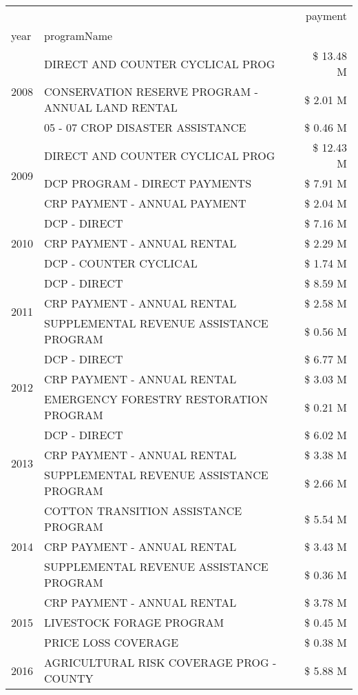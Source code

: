 \begin{tabular}{llr}
\toprule
 &  & payment \\
year & programName &  \\
\midrule
\multirow[t]{3}{*}{2008} & DIRECT AND COUNTER CYCLICAL PROG & \$ 13.48 M \\
 & CONSERVATION RESERVE PROGRAM - ANNUAL LAND RENTAL & \$ 2.01 M \\
 & 05 - 07 CROP DISASTER ASSISTANCE & \$ 0.46 M \\
\cline{1-3}
\multirow[t]{3}{*}{2009} & DIRECT AND COUNTER CYCLICAL PROG & \$ 12.43 M \\
 & DCP PROGRAM - DIRECT PAYMENTS & \$ 7.91 M \\
 & CRP PAYMENT - ANNUAL PAYMENT & \$ 2.04 M \\
\cline{1-3}
\multirow[t]{3}{*}{2010} & DCP - DIRECT & \$ 7.16 M \\
 & CRP PAYMENT - ANNUAL RENTAL & \$ 2.29 M \\
 & DCP - COUNTER CYCLICAL & \$ 1.74 M \\
\cline{1-3}
\multirow[t]{3}{*}{2011} & DCP - DIRECT & \$ 8.59 M \\
 & CRP PAYMENT - ANNUAL RENTAL & \$ 2.58 M \\
 & SUPPLEMENTAL REVENUE ASSISTANCE PROGRAM & \$ 0.56 M \\
\cline{1-3}
\multirow[t]{3}{*}{2012} & DCP - DIRECT & \$ 6.77 M \\
 & CRP PAYMENT - ANNUAL RENTAL & \$ 3.03 M \\
 & EMERGENCY FORESTRY RESTORATION PROGRAM & \$ 0.21 M \\
\cline{1-3}
\multirow[t]{3}{*}{2013} & DCP - DIRECT & \$ 6.02 M \\
 & CRP PAYMENT - ANNUAL RENTAL & \$ 3.38 M \\
 & SUPPLEMENTAL REVENUE ASSISTANCE PROGRAM & \$ 2.66 M \\
\cline{1-3}
\multirow[t]{3}{*}{2014} & COTTON TRANSITION ASSISTANCE PROGRAM & \$ 5.54 M \\
 & CRP PAYMENT - ANNUAL RENTAL & \$ 3.43 M \\
 & SUPPLEMENTAL REVENUE ASSISTANCE PROGRAM & \$ 0.36 M \\
\cline{1-3}
\multirow[t]{3}{*}{2015} & CRP PAYMENT - ANNUAL RENTAL & \$ 3.78 M \\
 & LIVESTOCK FORAGE PROGRAM & \$ 0.45 M \\
 & PRICE LOSS COVERAGE & \$ 0.38 M \\
\cline{1-3}
\multirow[t]{3}{*}{2016} & AGRICULTURAL RISK COVERAGE PROG - COUNTY & \$ 5.88 M \\

\end{tabular}
